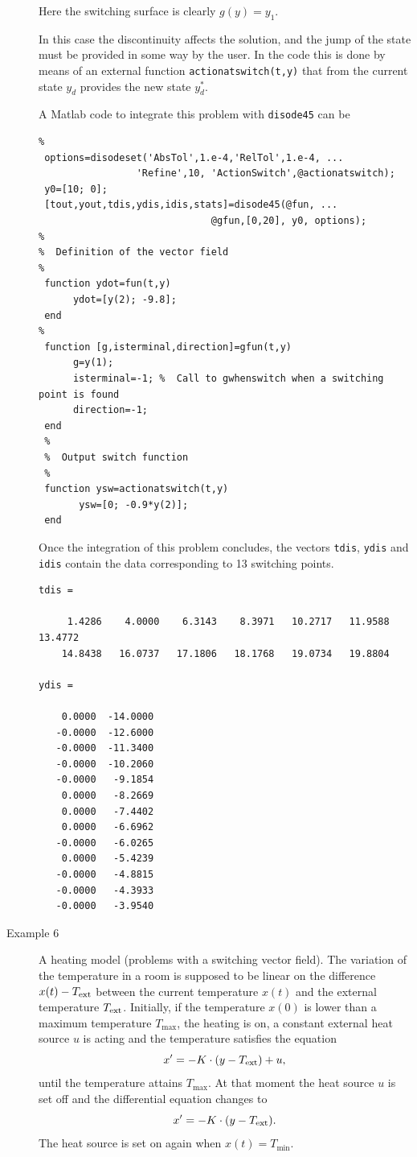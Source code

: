 \documentclass{article}
\begin{document}
\begin{description}
\medskip

Here the switching surface is clearly $g(y)=y_1$.

In this case the discontinuity affects the solution, and the jump of the
state must be provided in some way by the user.  In the code this is done by means
of an external function \texttt{actionatswitch(t,y)} that from the current state
$y_d$ provides the new state $y_d^*$.

A Matlab code to integrate this problem with \texttt{disode45} can be

\bigskip

\begin{verbatim}
%
 options=disodeset('AbsTol',1.e-4,'RelTol',1.e-4, ...
                 'Refine',10, 'ActionSwitch',@actionatswitch);
 y0=[10; 0];
 [tout,yout,tdis,ydis,idis,stats]=disode45(@fun, ...
                              @gfun,[0,20], y0, options);
%
%  Definition of the vector field
%
 function ydot=fun(t,y)
      ydot=[y(2); -9.8];
 end
%
 function [g,isterminal,direction]=gfun(t,y)
      g=y(1);
      isterminal=-1; %  Call to gwhenswitch when a switching point is found
      direction=-1;
 end
 %
 %  Output switch function
 %
 function ysw=actionatswitch(t,y)
       ysw=[0; -0.9*y(2)];
 end
 \end{verbatim}

Once the integration of this problem concludes, the vectors \texttt{tdis}, \texttt{ydis}
and \texttt{idis} contain the data corresponding to 13 switching points.

\begin{verbatim}
tdis =

     1.4286    4.0000    6.3143    8.3971   10.2717   11.9588   13.4772
    14.8438   16.0737   17.1806   18.1768   19.0734   19.8804

ydis =

    0.0000  -14.0000
   -0.0000  -12.6000
   -0.0000  -11.3400
   -0.0000  -10.2060
   -0.0000   -9.1854
    0.0000   -8.2669
    0.0000   -7.4402
    0.0000   -6.6962
   -0.0000   -6.0265
    0.0000   -5.4239
   -0.0000   -4.8815
   -0.0000   -4.3933
   -0.0000   -3.9540
\end{verbatim}

\item[Example 6]
A heating model (problems with a switching vector field).  The variation
of the temperature in a room is supposed to be linear on the difference
$x(t)- T_{\hbox{\scriptsize ext}}$
between the current temperature $x(t)$ and the external temperature
$T_{\hbox{\scriptsize ext}}$.
Initially, if the temperature
$x(0)$ is lower than a maximum temperature $T_{\max}$, the heating is on,
a constant external heat source $u$ is acting and the temperature
satisfies the equation
\[
x'=-K\cdot (y-T_{\hbox{\scriptsize ext}})+u,
\]
until the temperature attains $T_{\max}$.  At that moment the heat source $u$
is set off and the differential equation changes to
\[
x'=-K\cdot (y-T_{\hbox{\scriptsize ext}}).
\]
The heat source is set on again when $x(t)= T_{\min}$.


\end{description}
\end{document}
